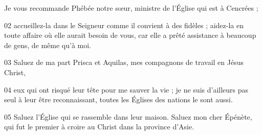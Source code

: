  Je vous recommande Phébée notre sœur, ministre de l’Église qui est à Cencrées ;

02 accueillez-la dans le Seigneur comme il convient à des fidèles ; aidez-la en toute affaire où elle aurait besoin de vous, car elle a prêté assistance à beaucoup de gens, de même qu’à moi.

03 Saluez de ma part Prisca et Aquilas, mes compagnons de travail en Jésus Christ,

04 eux qui ont risqué leur tête pour me sauver la vie ; je ne suis d’ailleurs pas seul à leur être reconnaissant, toutes les Églises des nations le sont aussi.

05 Saluez l’Église qui se rassemble dans leur maison. Saluez mon cher Épénète, qui fut le premier à croire au Christ dans la province d’Asie.